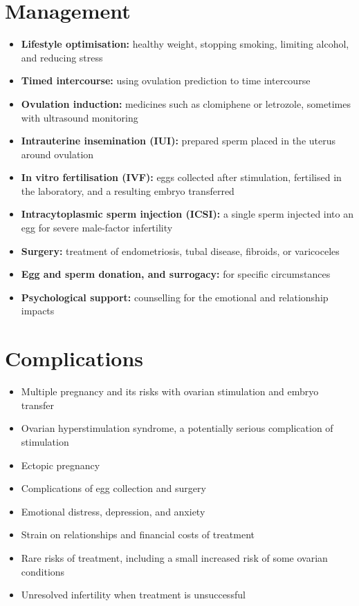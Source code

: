 \section*{Management}
\begin{itemize}
    \item \textbf{Lifestyle optimisation:} healthy weight, stopping smoking, limiting alcohol, and reducing stress
    \item \textbf{Timed intercourse:} using ovulation prediction to time intercourse
    \item \textbf{Ovulation induction:} medicines such as clomiphene or letrozole, sometimes with ultrasound monitoring
    \item \textbf{Intrauterine insemination (IUI):} prepared sperm placed in the uterus around ovulation
    \item \textbf{In vitro fertilisation (IVF):} eggs collected after stimulation, fertilised in the laboratory, and a resulting embryo transferred
    \item \textbf{Intracytoplasmic sperm injection (ICSI):} a single sperm injected into an egg for severe male-factor infertility
    \item \textbf{Surgery:} treatment of endometriosis, tubal disease, fibroids, or varicoceles
    \item \textbf{Egg and sperm donation, and surrogacy:} for specific circumstances
    \item \textbf{Psychological support:} counselling for the emotional and relationship impacts
\end{itemize}

\section*{Complications}
\begin{itemize}
    \item Multiple pregnancy and its risks with ovarian stimulation and embryo transfer
    \item Ovarian hyperstimulation syndrome, a potentially serious complication of stimulation
    \item Ectopic pregnancy
    \item Complications of egg collection and surgery
    \item Emotional distress, depression, and anxiety
    \item Strain on relationships and financial costs of treatment
    \item Rare risks of treatment, including a small increased risk of some ovarian conditions
    \item Unresolved infertility when treatment is unsuccessful
\end{itemize}

